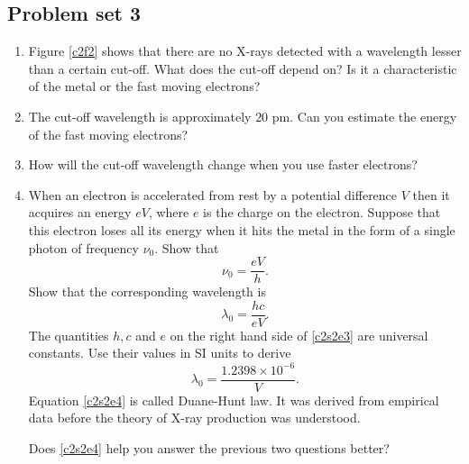 \subsection{Problem set 3}
\begin{enumerate}
\item Figure \ref{c2f2} shows that there are no X-rays detected with a 
wavelength lesser than a certain cut-off. What does the cut-off depend on? Is 
it a characteristic of the metal or the fast moving electrons?
\item The cut-off wavelength is approximately $20$ pm. Can you estimate the 
energy of the fast moving electrons?
\item How will the cut-off wavelength change when you use faster electrons?
\item When an electron is accelerated from rest by a potential difference 
$V$ then it acquires an energy $eV$, where $e$ is the charge on the electron.
Suppose that this electron loses all its energy when it hits the metal in the
form of a single photon of frequency $\nu_0$. Show that
\begin{equation}\label{c2s2e2}
\nu_0 = \frac{eV}{h}.
\end{equation}
Show that the corresponding wavelength is
\begin{equation}\label{c2s2e3}
\lambda_0 = \frac{hc}{eV}.
\end{equation}
The quantities $h, c$ and $e$ on the right hand side of \eqref{c2s2e3} are 
universal constants. Use their values in SI units to derive
\begin{equation}\label{c2s2e4}
\lambda_0 = \frac{1.2398 \times 10^{-6}}{V}.
\end{equation}
Equation \eqref{c2s2e4} is called Duane-Hunt law. It was derived from empirical
data before the theory of X-ray production was understood.

Does \eqref{c2s2e4} help you answer the previous two questions better?
\end{enumerate}

